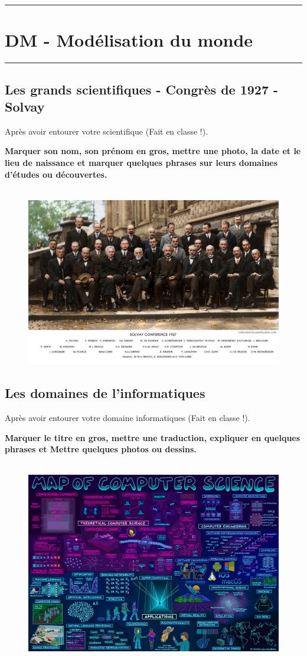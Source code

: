 \documentclass[12pt]{article}
\newcommand{\horrule}[1]{\rule{\linewidth}{#1}} %
\begin{document}
\setlength{\columnseprule}{1pt}

\horrule{2px}
\section*{DM - Modélisation du monde}
\horrule{2px}
\vspace{-1cm}

\subsection*{Les grands scientifiques - Congrès de 1927 - Solvay}

Après avoir entourer votre scientifique (Fait en classe !). 

\textbf{Marquer son nom, son prénom en gros, mettre une photo, la date et le lieu de naissance et marquer quelques phrases sur leurs domaines d'études ou découvertes.}

    \begin{figure}[H]
        \centering
        \includegraphics[width=0.7\linewidth]{4x5-calcul-litteral-1/sources/solvay.png}
  \end{figure}


\subsection*{Les domaines de l'informatiques}

Après avoir entourer votre domaine informatiques (Fait en classe !). 

\textbf{Marquer le titre en gros, mettre une traduction, expliquer en quelques phrases et Mettre quelques photos ou dessins.}

    \begin{figure}[H]
        \centering
        \includegraphics[width=0.6\linewidth]{4x5-calcul-litteral-1/sources/compsci.png}
  \end{figure}
\end{document}
